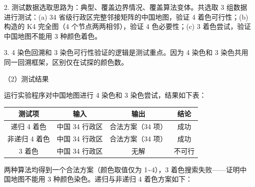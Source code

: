 \noindent\hspace*{2em}2. 测试数据选取思路为：典型、覆盖边界情况、覆盖算法变体。共选取 3 组数据进行测试：(a) 34 省级行政区完整邻接矩阵的中国地图，验证 4 着色可行性；(b) 构造的 K4 完全图（4 个节点两两相邻），验证 4 色必要性；(c) 3 着色尝试，验证中国地图不能用 3 种颜色着色。\par
\noindent\hspace*{2em}3. 4 染色回溯和 3 染色可行性验证的逻辑是测试重点。因为 4 染色和 3 染色共用同一回溯框架，区别仅在试探的颜色数。\par
\noindent\hspace*{2em}（2）测试结果\par
\noindent\hspace*{2em}运行实验程序对中国地图进行 4 染色和 3 染色尝试，结果如下表：\par
\begin{center}
\fontsize{9pt}{12pt}\selectfont
\renewcommand{\arraystretch}{1.25}
\begin{tabular}{|c|c|c|c|}
\hline
测试项 & 输入 & 输出 & 结论 \\ \hline
递归 4 着色 & 中国 34 行政区 & 合法方案（34 项） & 成功 \\ \hline
非递归 4 着色 & 中国 34 行政区 & 合法方案（34 项） & 成功 \\ \hline
3 着色 & 中国 34 行政区 & 无解 & 不可行 \\ \hline
\end{tabular}
\end{center}
\noindent\hspace*{2em}两种算法均得到一个合法方案（颜色取值仅为 1\~{}4），3 着色搜索失败——证明中国地图不能用 3 种颜色染色。递归与非递归 4 着色方案如下：\par
